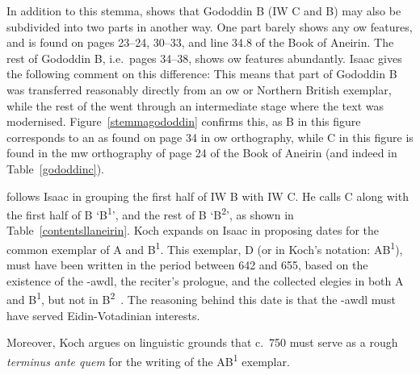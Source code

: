 In addition to this stemma, \textcite[87]{isaac_canu_1993} shows that Gododdin B (IW C and B) may also be subdivided into two parts in another way. One part barely shows any \gls{ow} features, and  is found on pages 23--24, 30--33, and line 34.8 of the Book of Aneirin. The rest of Gododdin B, i.e.\ pages 34--38, shows \gls{ow} features abundantly. Isaac gives the following comment on this difference: 
This means that part of Gododdin B was transferred reasonably directly from an \gls{ow} or Northern British exemplar, while the rest of the  went through an intermediate stage where the text was modernised. Figure~\ref{stemmagododdin} confirms this, as B in this figure corresponds to an  as found on page 34 in \gls{ow} orthography, while C in this figure is found in the \gls{mw} orthography of page 24 of the Book of Aneirin (and indeed in Table~\ref{gododdinc}).

\Textcite{koch_gododdin_1997} follows Isaac in grouping the first half of IW B with IW C. He calls C along with the first half of B `B\textsuperscript{1}', and the rest of B `B\textsuperscript{2}', as shown in Table~\ref{contentsllaneirin}. Koch expands on Isaac in proposing dates for the common exemplar of A and B\textsuperscript{1}. This exemplar, D (or in Koch's notation: AB\textsuperscript{1}), must have been written in the period between 642 and 655, based on the existence of the -awdl, the reciter's prologue, and the collected elegies in both A and B\textsuperscript{1}, but not in B\textsuperscript{2}~\autocite[lxv]{koch_gododdin_1997}. The reasoning behind this date is that the -awdl must have served Eidin-Votadinian interests.

Moreover, Koch argues on linguistic grounds that c.~750 must serve as a rough \emph{terminus ante quem} for the writing of the AB\textsuperscript{1} exemplar. 

